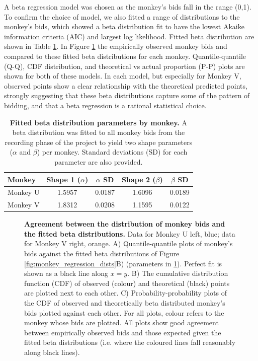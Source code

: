 A beta regression model was chosen as the monkey’s bids fall in the range (0,1). To confirm the choice of model, we also fitted a range of distributions to the monkey’s bids, which showed a beta distribution fit to have the lowest Akaike information criteria (AIC) and largest log likelihood. Fitted beta distribution are shown in Table \ref{tab:beta_params}. In Figure \ref{fig:monkey_quantiles} the empirically observed monkey bids and compared to these fitted beta distributions for each monkey. Quantile-quantile (Q-Q), CDF distribution, and theoretical vs actual proportion (P-P) plots are shown for both of these models. In each model, but especially for Monkey V, observed points show a clear relationship with the theoretical predicted points, strongly suggesting that these beta distributions capture some of the pattern of bidding, and that a beta regression is a rational statistical choice.

\begin{table}[htbp]
    \centering
    \begin{tabular}{lcccc}
        \hline
        \textbf{Monkey} & \textbf{Shape 1 ($\alpha$)} & \textbf{$\alpha$ SD} & \textbf{Shape 2 ($\beta$)} & \textbf{$\beta$ SD} \\
        \hline
        Monkey U & 1.5957 & 0.0187 & 1.6096 & 0.0189 \\
        Monkey V & 1.8312 & 0.0208 & 1.1595 & 0.0122 \\
        \hline
    \end{tabular}
\caption[Fitted beta distribution parameters by monkey.]{\textbf{Fitted beta distribution parameters by monkey.} A beta distribution was fitted to all monkey bids from the recording phase of the project to yield two shape parameters ($\alpha$ and $\beta$) per monkey. Standard deviations (SD) for each parameter are also provided.}
    \label{tab:beta_params}
\end{table}

\begin{figure}[htbp!] 
\centering    

\caption[Agreement between the distribution of monkey bids and the fitted beta distributions.]{\textbf{Agreement between the distribution of monkey bids and the fitted beta distributions.} Data for Monkey U left, blue; data for Monkey V right, orange. A) Quantile-quantile plots of monkey’s bids against the fitted beta distributions of Figure \ref{fig:monkey_regression_dists}B) (parameters in \ref{tab:beta_params}). Perfect fit is shown as a black line along $x=y$. B) The cumulative distribution function (CDF) of observed (colour) and theoretical (black) points are plotted next to each other. C) Probability-probability plots of the CDF of observed and theoretically beta distributed monkey’s bids plotted against each other. For all plots, colour refers to the monkey whose bids are plotted. All plots show good agreement between empirically observed bids and those expected given the fitted beta distributions (i.e. where the coloured lines fall reasonably along black lines).}
\label{fig:monkey_quantiles}
\end{figure}

